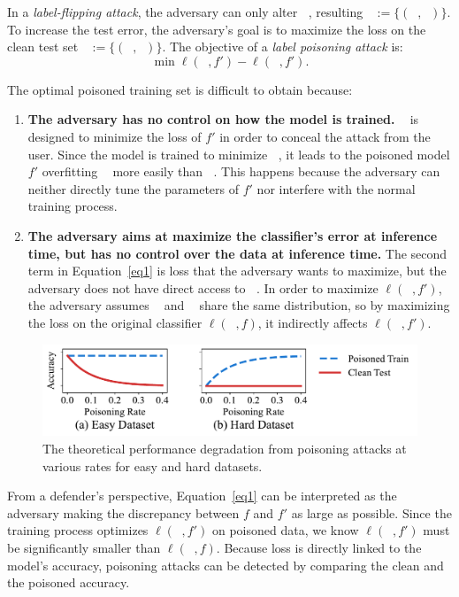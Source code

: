 \documentclass[runningheads]{llncs}
\DeclareMathOperator*{\Xtr}{\mathcal{X}_\text{train}}
\DeclareMathOperator*{\ytr}{\mathcal{Y}_\text{train}}
\DeclareMathOperator*{\Xte}{\mathcal{X}_\text{test}}
\DeclareMathOperator*{\yte}{\mathcal{Y}_\text{test}}
\DeclareMathOperator*{\ypo}{\mathcal{Y}^\prime_\text{train}}
\DeclareMathOperator*{\Dpo}{\mathcal{D}^\prime_\text{train}}
\DeclareMathOperator*{\Dtr}{\mathcal{D}_\text{train}}
\DeclareMathOperator*{\Dte}{\mathcal{D}_\text{test}}
\begin{document}
In a \emph{label-flipping attack}, the adversary can only alter $\ytr$, resulting $\Dpo:=\{(\Xtr, \ypo)\}$.
To increase the test error, the adversary's goal is to maximize the loss on the clean test set $\Dte:=\{(\Xte, \yte)\}$.
The objective of a \emph{label poisoning attack} \cite{munoz2017towards} is:
\begin{equation}
    \min_{\Dpo} \ell(\Dpo, f') - \ell(\Dte, f').
    \label{eq1}
\end{equation}

The optimal poisoned training set is difficult to obtain because:
\begin{enumerate}
\item \textbf{The adversary has no control on how the model is trained.} 
$\Dpo$ is designed to minimize the loss of $f'$ in order to conceal the attack from the user.
Since the model is trained to minimize $\Dpo$, it leads to the poisoned model $f'$ overfitting $\Dpo$ more easily than $\Dtr$.
This happens because the adversary can neither directly tune the parameters of $f'$ nor interfere with the normal training process.

\item \textbf{The adversary aims at maximize the classifier's error at inference time, but has no control over the data at inference time.}
The second term in Equation~\ref{eq1} is loss that the adversary wants to maximize, but the adversary does not have direct access to $\Dte$.
In order to maximize $\ell(\Dte, f')$, the adversary assumes $\Dtr$ and $\Dte$ share the same distribution, so by maximizing the loss on the original classifier $\ell(\Dpo, f)$, it indirectly affects $\ell(\Dte, f')$.
\end{enumerate}

\begin{figure}[t!]
    \centering
    \includegraphics[width=0.8\columnwidth]{images/fake_acc.pdf}
    \caption[Theoretical Performance Degradation Under Poisoning Attacks.]{The theoretical performance degradation from poisoning attacks at various rates for easy and hard datasets.}
    \label{fig.fake}
\end{figure}

From a defender's perspective,
Equation~\ref{eq1} can be interpreted as the adversary making the discrepancy between $f$ and $f'$ as large as possible.
Since the training process optimizes $\ell(\Dpo, f')$ on poisoned data,
we know $\ell(\Dpo, f')$ must be significantly smaller than $\ell(\Dpo, f)$.
Because loss is directly linked to the model's accuracy, poisoning attacks can be detected by comparing the clean and the poisoned accuracy.
\end{document}
